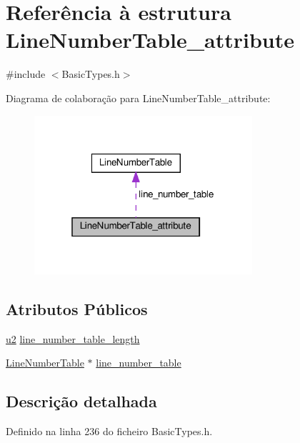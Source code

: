 \hypertarget{structLineNumberTable__attribute}{}\section{Referência à estrutura Line\+Number\+Table\+\_\+attribute}
\label{structLineNumberTable__attribute}


{\ttfamily \#include $<$Basic\+Types.\+h$>$}



Diagrama de colaboração para Line\+Number\+Table\+\_\+attribute\+:\nopagebreak
\begin{figure}[H]
\begin{center}
\leavevmode
\includegraphics[width=229pt]{structLineNumberTable__attribute__coll__graph}
\end{center}
\end{figure}
\subsection*{Atributos Públicos}
\begin{DoxyCompactItemize}
\item 
\hyperlink{BasicTypes_8h_a732cde1300aafb73b0ea6c2558a7a54f}{u2} \hyperlink{structLineNumberTable__attribute_a758c7ed4a08f1398c0ab0966ea59d7d4}{line\+\_\+number\+\_\+table\+\_\+length}
\item 
\hyperlink{structLineNumberTable}{Line\+Number\+Table} $\ast$ \hyperlink{structLineNumberTable__attribute_a8ec83f7d8f19a6a480733a9c87a6d7f8}{line\+\_\+number\+\_\+table}
\end{DoxyCompactItemize}


\subsection{Descrição detalhada}


Definido na linha 236 do ficheiro Basic\+Types.\+h.



